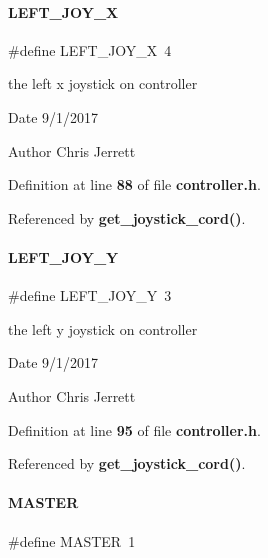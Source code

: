 \paragraph{L\+E\+F\+T\+\_\+\+J\+O\+Y\+\_\+X}
{\footnotesize\ttfamily \#define L\+E\+F\+T\+\_\+\+J\+O\+Y\+\_\+X~4}



the left x joystick on controller 

\begin{DoxyDate}{Date}
9/1/2017 
\end{DoxyDate}
\begin{DoxyAuthor}{Author}
Chris Jerrett 
\end{DoxyAuthor}


Definition at line \textbf{ 88} of file \textbf{ controller.\+h}.



Referenced by \textbf{ get\+\_\+joystick\+\_\+cord()}.

\mbox{\label{controller_8h_ae0a2b64db5fc4f4bf4b169185be93db3}} 
\paragraph{L\+E\+F\+T\+\_\+\+J\+O\+Y\+\_\+Y}
{\footnotesize\ttfamily \#define L\+E\+F\+T\+\_\+\+J\+O\+Y\+\_\+Y~3}



the left y joystick on controller 

\begin{DoxyDate}{Date}
9/1/2017 
\end{DoxyDate}
\begin{DoxyAuthor}{Author}
Chris Jerrett 
\end{DoxyAuthor}


Definition at line \textbf{ 95} of file \textbf{ controller.\+h}.



Referenced by \textbf{ get\+\_\+joystick\+\_\+cord()}.

\mbox{\label{controller_8h_a3fa2d3bf1901157f734a584d47b25d8b}} 
\paragraph{M\+A\+S\+T\+ER}
{\footnotesize\ttfamily \#define M\+A\+S\+T\+ER~1}



